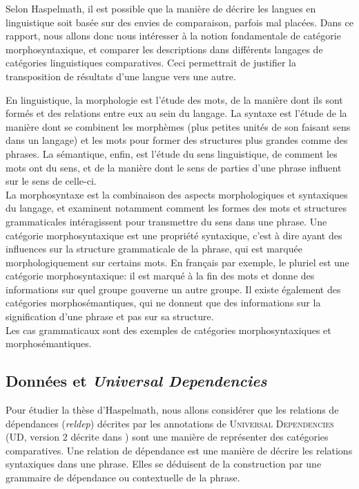 \documentclass{cours}
\begin{document}
Selon Haspelmath, il est possible que la manière de décrire les langues en linguistique soit basée sur des envies de comparaison, parfois mal placées.
Dans ce rapport, nous allons donc nous intéresser à la notion fondamentale de catégorie morphosyntaxique, et comparer les descriptions dans différents langages de catégories linguistiques comparatives.
Ceci permettrait de justifier la transposition de résultats d'une langue vers une autre.

\medskip
\label{subsec:linguistique}
En linguistique, la morphologie est l'étude des mots, de la manière dont ils sont formés et des relations entre eux au sein du langage.
La syntaxe est l'étude de la manière dont se combinent les morphèmes (plus petites unités de son faisant sens dans un langage) et les mots pour former des structures plus grandes comme des phrases.
La sémantique, enfin, est l'étude du sens linguistique, de comment les mots ont du sens, et de la manière dont le sens de parties d'une phrase influent sur le sens de celle-ci.\\
La morphosyntaxe est la combinaison des aspects morphologiques et syntaxiques du langage, et examinent notamment comment les formes des mots et structures grammaticales intéragissent pour transmettre du sens dans une phrase.
Une catégorie morphosyntaxique est une propriété syntaxique, c'est à dire ayant des influences sur la structure grammaticale de la phrase, qui est marquée morphologiquement sur certains mots.
En français par exemple, le pluriel est une catégorie morphosyntaxique: il est marqué à la fin des mots et donne des informations sur quel groupe gouverne un autre groupe.
Il existe également des catégories morphosémantiques, qui ne donnent que des informations sur la signification d'une phrase et pas sur sa structure.\\
\medskip
Les cas grammaticaux sont des exemples de catégories morphosyntaxiques et morphosémantiques.

\subsection{Données et \emph{Universal Dependencies}}\label{subsec:données}
Pour étudier la thèse d'Haspelmath, nous allons considérer que les relations de dépendances (\textit{reldep}) décrites par les annotations de \textsc{Universal Dependencies} (UD, version 2 décrite dans \cite{UDv2}) sont une manière de représenter des catégories comparatives.
Une relation de dépendance est une manière de décrire les relations syntaxiques dans une phrase.
Elles se déduisent de la construction par une grammaire de dépendance ou contextuelle de la phrase.
\end{document}
